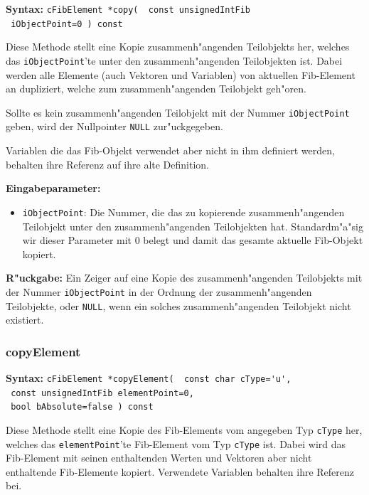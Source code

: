 \textbf{Syntax:} \verb|cFibElement *copy(  const unsignedIntFib| \\\verb| iObjectPoint=0 ) const|

\bigskip\noindent
Diese Methode stellt eine Kopie zusammenh"angenden Teilobjekts her, welches das \verb|iObjectPoint|'te unter den zusammenh"angenden Teilobjekten ist. Dabei werden alle Elemente (auch Vektoren und Variablen) von aktuellen Fib-Element an dupliziert, welche zum zusammenh"angenden Teilobjekt geh"oren.

Sollte es kein zusammenh"angenden Teilobjekt mit der Nummer \verb|iObjectPoint| geben, wird der Nullpointer \verb|NULL| zur"uckgegeben.

Variablen die das Fib-Objekt verwendet aber nicht in ihm definiert werden, behalten ihre Referenz auf ihre alte Definition.

\bigskip\noindent
\textbf{Eingabeparameter:}
\begin{itemize}
 \item \verb|iObjectPoint|: Die Nummer, die das zu kopierende zusammenh"angenden Teilobjekt unter den zusammenh"angenden Teilobjekten hat. Standardm"a"sig wir dieser Parameter mit $0$ belegt und damit das gesamte aktuelle Fib-Objekt kopiert.
\end{itemize}

\bigskip\noindent
\textbf{R"uckgabe:} Ein Zeiger auf eine Kopie des zusammenh"angenden Teilobjekts mit der Nummer \verb|iObjectPoint| in der Ordnung der zusammenh"angenden Teilobjekte, oder \verb|NULL|, wenn ein solches zusammenh"angenden Teilobjekt nicht existiert.


\subsubsection{copyElement}

\textbf{Syntax:} \verb|cFibElement *copyElement(  const char cType='u', | \\\verb| const unsignedIntFib elementPoint=0,| \\\verb| bool bAbsolute=false ) const|

\bigskip\noindent
Diese Methode stellt eine Kopie des Fib-Elements vom angegeben Typ \verb|cType| her, welches das \verb|elementPoint|'te Fib-Element vom Typ \verb|cType| ist. Dabei wird das Fib-Element mit seinen enthaltenden Werten und Vektoren aber nicht enthaltende Fib-Elemente kopiert. Verwendete Variablen behalten ihre Referenz bei.

